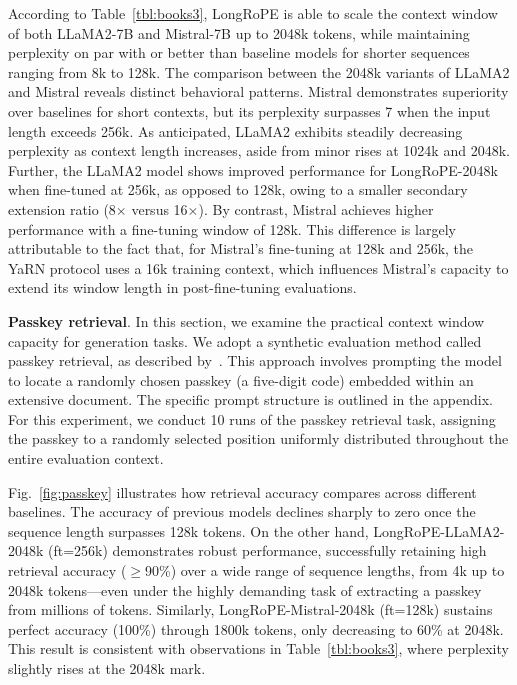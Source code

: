 According to Table~\ref{tbl:books3}, LongRoPE is able to scale the context window of both LLaMA2-7B and Mistral-7B up to 2048k tokens, while maintaining perplexity on par with or better than baseline models for shorter sequences ranging from 8k to 128k. The comparison between the 2048k variants of LLaMA2 and Mistral reveals distinct behavioral patterns. Mistral demonstrates superiority over baselines for short contexts, but its perplexity surpasses 7 when the input length exceeds 256k. As anticipated, LLaMA2 exhibits steadily decreasing perplexity as context length increases, aside from minor rises at 1024k and 2048k. Further, the LLaMA2 model shows improved performance for LongRoPE-2048k when fine-tuned at 256k, as opposed to 128k, owing to a smaller secondary extension ratio (8$\times$ versus 16$\times$). By contrast, Mistral achieves higher performance with a fine-tuning window of 128k. This difference is largely attributable to the fact that, for Mistral's fine-tuning at 128k and 256k, the YaRN protocol uses a 16k training context, which influences Mistral's capacity to extend its window length in post-fine-tuning evaluations.

\textbf{Passkey retrieval}. In this section, we examine the practical context window capacity for generation tasks. We adopt a synthetic evaluation method called passkey retrieval, as described by~\cite{passkey}. This approach involves prompting the model to locate a randomly chosen passkey (a five-digit code) embedded within an extensive document. The specific prompt structure is outlined in the appendix. For this experiment, we conduct 10 runs of the passkey retrieval task, assigning the passkey to a randomly selected position uniformly distributed throughout the entire evaluation context.

Fig.~\ref{fig:passkey} illustrates how retrieval accuracy compares across different baselines. The accuracy of previous models declines sharply to zero once the sequence length surpasses 128k tokens. On the other hand, LongRoPE-LLaMA2-2048k (ft=256k) demonstrates robust performance, successfully retaining high retrieval accuracy ($\ge$90\%) over a wide range of sequence lengths, from 4k up to 2048k tokens—even under the highly demanding task of extracting a passkey from millions of tokens. Similarly, LongRoPE-Mistral-2048k (ft=128k) sustains perfect accuracy (100\%) through 1800k tokens, only decreasing to 60\% at 2048k. This result is consistent with observations in Table~\ref{tbl:books3}, where perplexity slightly rises at the 2048k mark.

